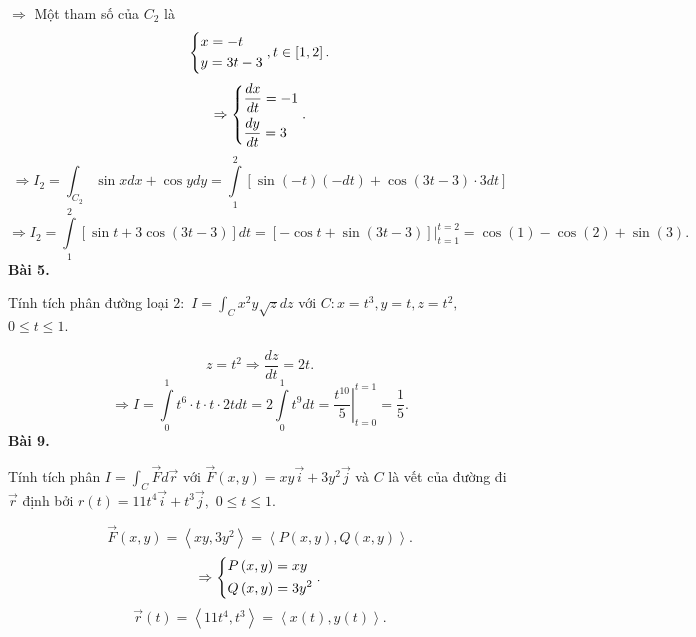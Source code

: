 \documentclass[12pt,a4paper]{article}
\begin{document}
\(\Rightarrow\) Một tham số của \(C_2\) là
\[\left\{ \begin{gathered}
  x =  - t \hfill \\
  y = 3t - 3 \hfill \\ 
\end{gathered}  \right.,t \in \left[ {1,2} \right].\]
\[ \Rightarrow \left\{ \begin{gathered}
  \frac{{dx}}{{dt}} =  - 1 \hfill \\
  \frac{{dy}}{{dt}} = 3 \hfill \\ 
\end{gathered}  \right..\]
\[ \Rightarrow {I_2} = \int_{{C_2}} {\sin xdx + \cos ydy}  = \int\limits_1^2 {\left[ {\sin \left( { - t} \right)\left( { - dt} \right) + \cos \left( {3t - 3} \right) \cdot 3dt} \right]} \]
\[ \Rightarrow {I_2} = \int\limits_1^2 {\left[ {\sin t + 3\cos \left( {3t - 3} \right)} \right]} dt = \left. {\left[ { - \cos t + \sin \left( {3t - 3} \right)} \right]} \right|_{t = 1}^{t = 2} = \cos \left( 1 \right) - \cos \left( 2 \right) + \sin \left( 3 \right).\]
\textbf{Bài 5.}
\begin{mybox}
Tính tích phân đường loại \(2:\) \(I = \int_C {{x^2}y\sqrt z dz} \) với \(C:x = {t^3},y = t,z = {t^2},\) \(0 \leqslant t \leqslant 1.\)
\end{mybox}
\[z = {t^2} \Rightarrow \frac{{dz}}{{dt}} = 2t.\]
\[ \Rightarrow I = \int\limits_0^1 {{t^6} \cdot t \cdot t \cdot 2tdt}  = 2\int\limits_0^1 {{t^9}} dt = \left. {\frac{{{t^{10}}}}{5}} \right|_{t = 0}^{t = 1} = \frac{1}{5}.\]
\textbf{Bài 9.}
\begin{mybox}
Tính tích phân \(I = \int_C {\overrightarrow{F}d\overrightarrow{r}}\) với \(\overrightarrow F \left( {x,y} \right) = xy\overrightarrow i  + 3{y^2}\overrightarrow j \) và \(C\) là vết của đường đi \(\overrightarrow{r}\) định bởi \(r\left( t \right) = 11{t^4}\overrightarrow i  + {t^3}\overrightarrow j ,\) \(0 \leqslant t \leqslant 1.\)
\end{mybox}
\[\overrightarrow F \left( {x,y} \right) = \left\langle {xy,3{y^2}} \right\rangle  = \left\langle {P\left( {x,y} \right),Q\left( {x,y} \right)} \right\rangle .\]
\[ \Rightarrow \left\{ \begin{gathered}
  P\left( {x,y} \right) = xy \hfill \\
  Q\left( {x,y} \right) = 3{y^2} \hfill \\ 
\end{gathered}  \right..\]
\[\overrightarrow r \left( t \right) = \left\langle {11{t^4},{t^3}} \right\rangle  = \left\langle {x\left( t \right),y\left( t \right)} \right\rangle .\]
\end{document}
